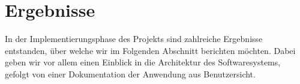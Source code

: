 \section{Ergebnisse}
\label{sec:results}

In der Implementierungsphase des Projekts sind zahlreiche Ergebnisse entstanden, über welche wir im Folgenden Abschnitt berichten möchten.
Dabei geben wir vor allem einen Einblick in die Architektur des Softwaresystems, gefolgt von einer Dokumentation der Anwendung aus Benutzersicht.




